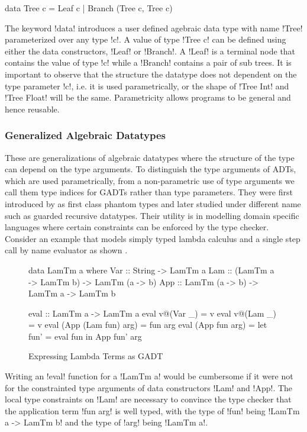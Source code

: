 \documentclass[manuscript,screen,nonacm]{acmart}
\begin{document}
\begin{code}
  data Tree c = Leaf c | Branch (Tree c, Tree c)
\end{code}

The keyword !data! introduces a user defined agebraic data type with name !Tree! parameterized over any type !c!. A value of type !Tree c! can be defined using either the data constructors, !Leaf! or !Branch!. A !Leaf! is a terminal node that contains the value of type !c! while a !Branch! contains a pair of sub trees. It is important to observe that the structure the datatype does not dependent on the type parameter !c!, i.e. it is used parametrically, or the shape of !Tree Int! and !Tree Float! will be the same. Parametricity allows programs to be general and hence reusable. 

\subsubsection{Generalized Algebraic Datatypes}
These are generalizations of algebraic datatypes where the structure of the type can depend on the type arguments. To distinguish the type arguments of ADTs, which are used parametrically, from a non-parametric use of type arguments we call them type indices for GADTs rather than type parameters. They were first introduced by \citep{cheney_first-class_2003} as first class phantom types and later studied under different name such as guarded recursive datatypes\cite{xi_guarded_2003}. Their utility is in modelling domain specific languages where certain constraints can be enforced by the type checker. Consider an example that models simply typed lambda calculus and a single step call by name evaluator as shown .
\begin{figure}[ht]
  \centering
  \begin{minipage}[ht]{0.5\linewidth}
    \begin{code}
data LamTm a where
  Var :: String -> LamTm a
  Lam :: (LamTm a -> LamTm b) -> LamTm (a -> b)
  App :: LamTm (a -> b) -> LamTm a -> LamTm b
    \end{code}
  \end{minipage}%
  \begin{minipage}[ht]{0.5\linewidth}
    \begin{code}
      eval :: LamTm a -> LamTm a
      eval v@(Var _) = v
      eval v@(Lam _) = v
      eval (App (Lam fun) arg) = fun arg
      eval (App fun arg) = let fun' = eval fun
                           in App fun' arg
    \end{code}
  \end{minipage}
  \caption{Expressing Lambda Terms as GADT}
  \label{fig:gadt-example}
\end{figure}
Writing an !eval! function for a !LamTm a! would be cumbersome if it were not for the constrainted type arguments of data constructors !Lam! and !App!. The local type constraints on !Lam! are necessary to convince the type checker that the application term !fun arg! is well typed, with the type of !fun! being !LamTm a -> LamTm b! and the type of !arg! being !LamTm a!.
\end{document}
